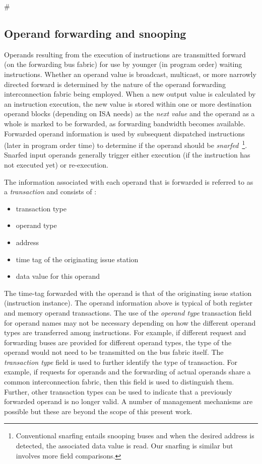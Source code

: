 #\documentclass[10pt,dvips]{article}
\begin{document}
\subsection{Operand forwarding and snooping}
%
Operands resulting from the execution of instructions
are transmitted forward (on the forwarding bus fabric)
for use by younger (in program order) waiting instructions.
Whether an operand value is broadcast, multicast, or more narrowly
directed forward
is determined by the nature of the operand forwarding interconnection
fabric being employed.
When a new output value is calculated by an instruction execution,
the new value is stored within one or more destination operand blocks
(depending on ISA needs) as
the \textit{next value} and the operand as a whole
is marked to be forwarded, as forwarding bandwidth becomes
available.
Forwarded operand information is used by subsequent 
dispatched instructions 
(later in program order time)
to determine if
the operand should be {\em snarfed}~\footnote{Conventional
snarfing entails snooping
buses and when the desired address is detected, 
the associated data value is read.  Our snarfing is
similar but involves more field comparisons.}.
Snarfed input operands generally trigger either execution
(if the instruction has not executed yet)
or re-execution.

The information associated with each operand that is
forwarded is referred
to as a {\em transaction} and consists of :
%
\begin{itemize}
\vspace{-0.10in}
\item{transaction type}
\vspace{-0.10in}
\item{operand type}
\vspace{-0.10in}
\item{address}
\vspace{-0.10in}
\item{time tag of the originating issue station}
\vspace{-0.10in}
\item{data value for this operand}
\vspace{-0.10in}
\end{itemize}   
%
The time-tag forwarded with the operand is that of the originating
issue station (instruction instance).
The operand information above is typical of both
register and memory operand transactions.
The use of the \textit{operand type} transaction field 
for operand names may not be
necessary depending on how the different operand types
are transferred among instructions.
For example, if different request and forwarding buses are
provided for different operand types, the type of the operand
would not need to be transmitted on the bus fabric itself.
The \textit{transaction type} field is used to further
identify the type of transaction.  
For example, if requests for operands and the forwarding of
actual operands share a common interconnection fabric, then
this field is used to distinguish them.
Further, other transaction types can be used to indicate that
a previously forwarded operand is no longer valid.
A number of management mechanisms are possible but
these are beyond the scope of this present work.
\end{document}
